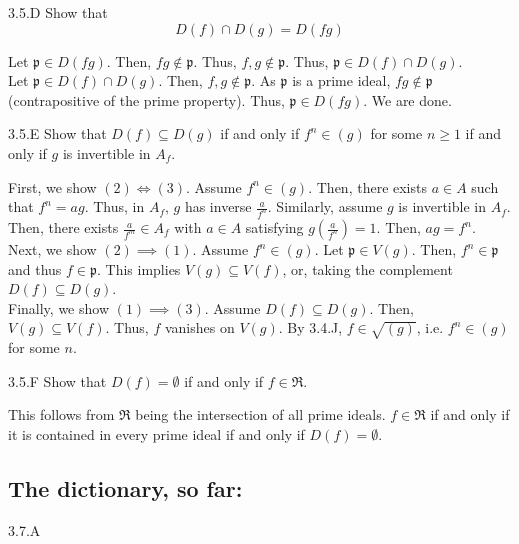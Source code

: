 \begin{exercise}{3.5.D}
    Show that
        \[ D(f) \cap D(g) = D(fg) \]
\end{exercise}
\begin{solution}
    Let $\mathfrak p \in D(fg)$. Then, $fg \not \in \mathfrak p$. Thus, $f,g \not \in \mathfrak p$. Thus, $\mathfrak p \in D(f) \cap D(g)$. \\
    Let $\mathfrak p \in D(f) \cap D(g)$. Then, $f, g \not \in \mathfrak p$. As $\mathfrak p$ is a prime ideal, $fg \not \in \mathfrak p$ (contrapositive of the prime property). Thus, $\mathfrak p \in D(fg)$. We are done. 
\end{solution}

\begin{exercise}{3.5.E}
    Show that $D(f) \subseteq D(g)$ if and only if $f^n \in (g)$ for some $n \geq 1$ if and only if $g$ is invertible in $A_f$. 
\end{exercise}
\begin{solution}
    First, we show $(2) \iff (3)$. Assume $f^n \in (g)$. Then, there exists $a \in A$ such that $f^n = ag$. Thus, in $A_f$, $g$ has inverse $\frac{a}{f^n}$. Similarly, assume $g$ is invertible in $A_f$. Then, there exists $\frac{a}{f^m} \in A_f$ with $a \in A$ satisfying $g\left(\frac{a}{f^n}\right) = 1$. Then, $ag = f^n$. \\
    Next, we show $(2) \implies (1)$. Assume $f^n \in (g)$. Let $\mathfrak p \in V(g)$. Then, $f^n \in \mathfrak p$ and thus $f \in \mathfrak p$. This implies $V(g) \subseteq V(f)$, or, taking the complement $D(f) \subseteq D(g)$. \\
    Finally, we show $(1) \implies (3)$. Assume $D(f) \subseteq D(g)$. Then, $V(g) \subseteq V(f)$. Thus, $f$ vanishes on $V(g)$. By 3.4.J, $f \in \sqrt{(g)}$, i.e. $f^n \in (g)$ for some $n$. 
\end{solution}

\begin{exercise}{3.5.F}
    Show that $D(f) = \emptyset$ if and only if $f \in \mathfrak R$. 
\end{exercise}
\begin{solution}
    This follows from $\mathfrak R$ being the intersection of all prime ideals. $f \in \mathfrak R$ if and only if it is contained in every prime ideal if and only if $D(f) = \emptyset$.
\end{solution}

\subsection{The dictionary, so far:}
\begin{exercise}{3.7.A}

\end{exercise}
\begin{solution}
    \todo{}
\end{solution}

